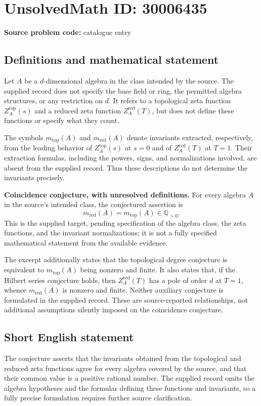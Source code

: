 \documentclass[11pt]{article}
\newcommand{\Q}{\mathbb{Q}}
\begin{document}
\section*{UnsolvedMath ID: 30006435}
\textbf{Source problem code:} catalogue entry
\subsection{Definitions and mathematical statement}
Let \(A\) be a \(d\)-dimensional algebra in the class intended by the source. The supplied record does not specify the base field or ring, the permitted algebra structures, or any restriction on \(d\). It refers to a topological zeta function \(Z_A^{\mathrm{top}}(s)\) and a reduced zeta function \(Z_A^{\mathrm{red}}(T)\), but does not define these functions or specify what they count.

The symbols \(m_{\mathrm{top}}(A)\) and \(m_{\mathrm{red}}(A)\) denote invariants extracted, respectively, from the leading behavior of \(Z_A^{\mathrm{top}}(s)\) at \(s=0\) and of \(Z_A^{\mathrm{red}}(T)\) at \(T=1\). Their extraction formulas, including the powers, signs, and normalizations involved, are absent from the supplied record. Thus these descriptions do not determine the invariants precisely.

\textbf{Coincidence conjecture, with unresolved definitions.} For every algebra \(A\) in the source's intended class, the conjectured assertion is
\[
 m_{\mathrm{red}}(A)=m_{\mathrm{top}}(A)\in\Q_{>0}.
\]
This is the supplied target, pending specification of the algebra class, the zeta functions, and the invariant normalizations; it is not a fully specified mathematical statement from the available evidence.

The excerpt additionally states that the topological degree conjecture is equivalent to \(m_{\mathrm{top}}(A)\) being nonzero and finite. It also states that, if the Hilbert series conjecture holds, then \(Z_A^{\mathrm{red}}(T)\) has a pole of order \(d\) at \(T=1\), whence \(m_{\mathrm{red}}(A)\) is nonzero and finite. Neither auxiliary conjecture is formulated in the supplied record. These are source-reported relationships, not additional assumptions silently imposed on the coincidence conjecture.
\subsection{Short English statement}
The conjecture asserts that the invariants obtained from the topological and reduced zeta functions agree for every algebra covered by the source, and that their common value is a positive rational number. The supplied record omits the algebra hypotheses and the formulas defining these functions and invariants, so a fully precise formulation requires further source clarification.
\end{document}
